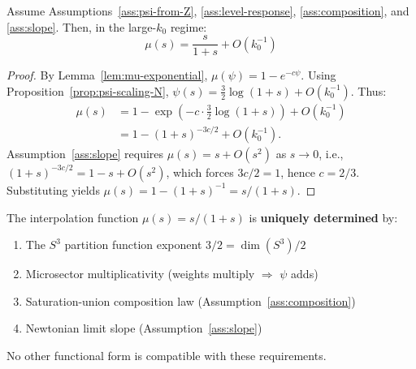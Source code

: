 \begin{theorem}\label{thm:mu-theorem}
Assume Assumptions~\ref{ass:psi-from-Z}, \ref{ass:level-response}, \ref{ass:composition}, and \ref{ass:slope}. Then, in the large-$k_0$ regime:
\begin{equation}
\boxed{\mu(s) = \frac{s}{1+s} + O(k_0^{-1})}
\label{eq:mu-final}
\end{equation}
\end{theorem}

\begin{proof}
By Lemma~\ref{lem:mu-exponential}, $\mu(\psi) = 1 - e^{-c\psi}$. Using Proposition~\ref{prop:psi-scaling-N}, $\psi(s) = \frac{3}{2}\log(1+s) + O(k_0^{-1})$. Thus:
\begin{align*}
\mu(s) &= 1 - \exp\left(-c \cdot \frac{3}{2}\log(1+s)\right) + O(k_0^{-1})\\
&= 1 - (1+s)^{-3c/2} + O(k_0^{-1}).
\end{align*}
Assumption~\ref{ass:slope} requires $\mu(s) = s + O(s^2)$ as $s \to 0$, i.e., $(1+s)^{-3c/2} = 1 - s + O(s^2)$, which forces $3c/2 = 1$, hence $c = 2/3$. Substituting yields $\mu(s) = 1 - (1+s)^{-1} = s/(1+s)$.
\end{proof}

\begin{tcolorbox}[colback=blue!5!white, colframe=blue!60!black, title={Theorem-Grade Result: $\mu(x) = x/(1+x)$}]
The interpolation function $\mu(s) = s/(1+s)$ is \textbf{uniquely determined} by:
\begin{enumerate}
\item The $S^3$ partition function exponent $3/2 = \dim(S^3)/2$
\item Microsector multiplicativity (weights multiply $\Rightarrow$ $\psi$ adds)
\item Saturation-union composition law (Assumption~\ref{ass:composition})
\item Newtonian limit slope (Assumption~\ref{ass:slope})
\end{enumerate}
No other functional form is compatible with these requirements.
\end{tcolorbox}

